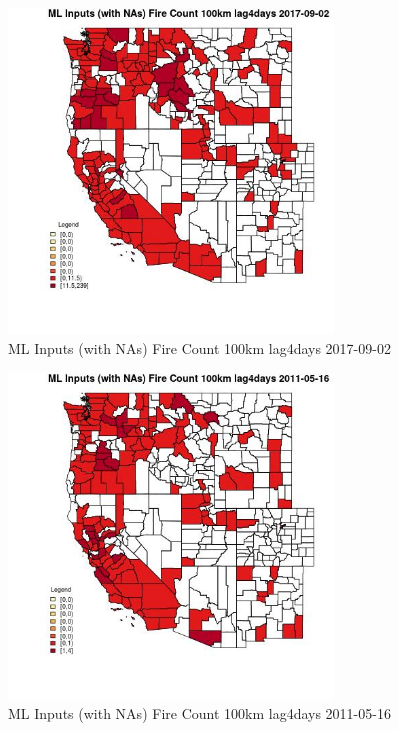 \clearpage 

\begin{figure} 
\centering  
\includegraphics[width=0.77\textwidth]{Code_Outputs/Report_ML_input_PM25_Step4_part_e_de_duplicated_aves_compiled_2019-05-20wNAs_CountyFire_Count_100km_lag4daysMean2017-09-02.jpg} 
\caption{\label{fig:Report_ML_input_PM25_Step4_part_e_de_duplicated_aves_compiled_2019-05-20wNAsCountyFire_Count_100km_lag4daysMean2017-09-02}ML Inputs (with NAs) Fire Count 100km lag4days 2017-09-02} 
\end{figure} 
 

\begin{figure} 
\centering  
\includegraphics[width=0.77\textwidth]{Code_Outputs/Report_ML_input_PM25_Step4_part_e_de_duplicated_aves_compiled_2019-05-20wNAs_CountyFire_Count_100km_lag4daysMean2011-05-16.jpg} 
\caption{\label{fig:Report_ML_input_PM25_Step4_part_e_de_duplicated_aves_compiled_2019-05-20wNAsCountyFire_Count_100km_lag4daysMean2011-05-16}ML Inputs (with NAs) Fire Count 100km lag4days 2011-05-16} 
\end{figure} 
 

